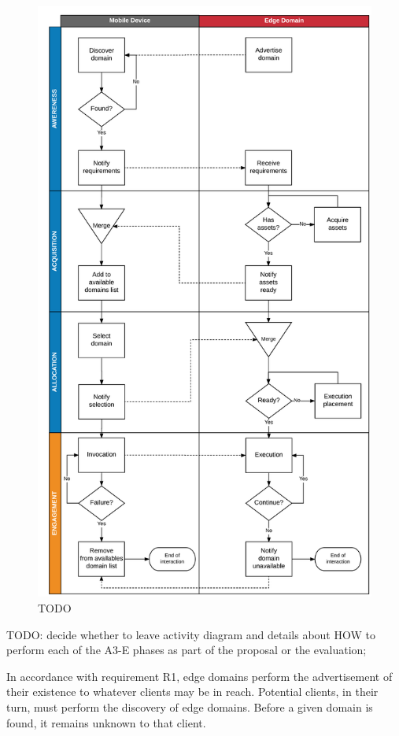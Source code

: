 \begin{figure}
	\includegraphics[height=\textheight]{figs/activities.png}
	\caption{TODO}
	\label{fig:activities}
\end{figure}

TODO: decide whether to leave activity diagram and details about HOW to perform each of the A3-E phases as part of the proposal or the evaluation; 

In accordance with requirement R1, edge domains perform the advertisement of their existence to whatever clients may be in reach. Potential clients, in their turn, must perform the discovery of edge domains. Before a given domain is found, it remains unknown to that client.


